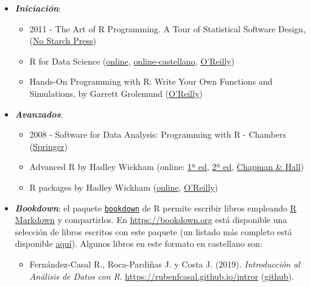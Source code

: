 \documentclass[
]{book}
\providecommand{\tightlist}{%
  \setlength{\itemsep}{0pt}\setlength{\parskip}{0pt}}
\theoremstyle{break}
\theoremstyle{definition}
\theoremstyle{definition}
\theoremstyle{definition}
\theoremstyle{remark}
\begin{document}
\begin{itemize}
\item
  \textbf{\emph{Iniciación}}:

  \begin{itemize}
  \item
    2011 - The Art of R Programming. A Tour of Statistical Software Design,
    (\href{https://www.nostarch.com/artofr.htm}{No Starch Press})
  \item
    R for Data Science
    (\href{http://r4ds.had.co.nz}{online}, \href{https://es.r4ds.hadley.nz}{online-castellano},
    \href{http://shop.oreilly.com/product/0636920034407.do}{O'Reilly})
  \item
    Hands-On Programming with R: Write Your Own Functions and Simulations,
    by Garrett Grolemund
    (\href{http://shop.oreilly.com/product/0636920028574.do}{O'Reilly})
  \end{itemize}
\item
  \textbf{\emph{Avanzados}}:

  \begin{itemize}
  \item
    2008 - Software for Data Analysis: Programming with R - Chambers
    (\href{http://www.springer.com/la/book/9780387759357}{Springer})
  \item
    Advanced R by Hadley Wickham
    (online: \href{http://adv-r.had.co.nz/}{1ª ed},
    \href{https://adv-r.hadley.nz/}{2ª ed},
    \href{https://www.amazon.com/dp/1466586966}{Chapman \& Hall})
  \item
    R packages by Hadley Wickham
    (\href{http://r-pkgs.had.co.nz/}{online},
    \href{http://shop.oreilly.com/product/0636920034421.do}{O'Reilly})
  \end{itemize}
\item
  \textbf{\emph{Bookdown}}:
  el paquete \href{https://bookdown.org}{\texttt{bookdown}} de R permite escribir libros empleando
  \href{http://rmarkdown.rstudio.com}{R Markdown} y compartirlos.
  En \url{https://bookdown.org} está disponible una selección de libros escritos con este paquete
  (un listado más completo está disponible \href{https://bookdown.org/home/archive/}{aquí}).
  Algunos libros en este formato en castellano son:

  \begin{itemize}
  \tightlist
  \item
    Fernández-Casal R., Roca-Pardiñas J. y Costa J. (2019). \emph{Introducción al Análisis de Datos con R}. \url{https://rubenfcasal.github.io/intror} (\href{https://github.com/rubenfcasal/intror}{github}).
  \end{itemize}


\end{itemize}
\end{document}
